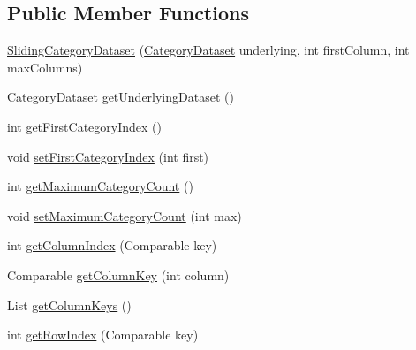 \subsection*{Public Member Functions}
\begin{DoxyCompactItemize}
\item 
\mbox{\hyperlink{classorg_1_1jfree_1_1data_1_1category_1_1_sliding_category_dataset_a0d6b1442f88e86da36a8462be2cda644}{Sliding\+Category\+Dataset}} (\mbox{\hyperlink{interfaceorg_1_1jfree_1_1data_1_1category_1_1_category_dataset}{Category\+Dataset}} underlying, int first\+Column, int max\+Columns)
\item 
\mbox{\hyperlink{interfaceorg_1_1jfree_1_1data_1_1category_1_1_category_dataset}{Category\+Dataset}} \mbox{\hyperlink{classorg_1_1jfree_1_1data_1_1category_1_1_sliding_category_dataset_af4ec01422ac8a4ad9201097f359b5a78}{get\+Underlying\+Dataset}} ()
\item 
int \mbox{\hyperlink{classorg_1_1jfree_1_1data_1_1category_1_1_sliding_category_dataset_a49c20f92d2e200495654034cd794f2d9}{get\+First\+Category\+Index}} ()
\item 
void \mbox{\hyperlink{classorg_1_1jfree_1_1data_1_1category_1_1_sliding_category_dataset_a757306381117f304d57cda56a23c9560}{set\+First\+Category\+Index}} (int first)
\item 
int \mbox{\hyperlink{classorg_1_1jfree_1_1data_1_1category_1_1_sliding_category_dataset_aba9d4fd7a8a49f295a2704c0dc1030b3}{get\+Maximum\+Category\+Count}} ()
\item 
void \mbox{\hyperlink{classorg_1_1jfree_1_1data_1_1category_1_1_sliding_category_dataset_a10e63844beab0737535bfde779f1cbff}{set\+Maximum\+Category\+Count}} (int max)
\item 
int \mbox{\hyperlink{classorg_1_1jfree_1_1data_1_1category_1_1_sliding_category_dataset_a0860f901b12c1330b9b442e8b378e237}{get\+Column\+Index}} (Comparable key)
\item 
Comparable \mbox{\hyperlink{classorg_1_1jfree_1_1data_1_1category_1_1_sliding_category_dataset_aefb8cdefb6baf9ef40d25de9b5c33c63}{get\+Column\+Key}} (int column)
\item 
List \mbox{\hyperlink{classorg_1_1jfree_1_1data_1_1category_1_1_sliding_category_dataset_adfd4f4d9f2ead4df88b5793517429ddf}{get\+Column\+Keys}} ()
\item 
int \mbox{\hyperlink{classorg_1_1jfree_1_1data_1_1category_1_1_sliding_category_dataset_ad364c75ca5d7a8bae6f3eaa2e0807310}{get\+Row\+Index}} (Comparable key)
\item 

\end{DoxyCompactItemize}
